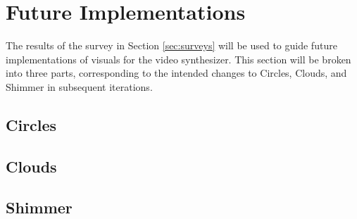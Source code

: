 \documentclass[../initial_thesis.tex]{subfiles}
\begin{document}
\section{Future Implementations}
The results of the survey in Section \ref{sec:surveys} will be used to guide future implementations of visuals for the video synthesizer. This section will be broken into three parts, corresponding to the intended changes to Circles, Clouds, and Shimmer in subsequent iterations.

\subsection{Circles}
\subsection{Clouds}
\subsection{Shimmer}
\end{document}
